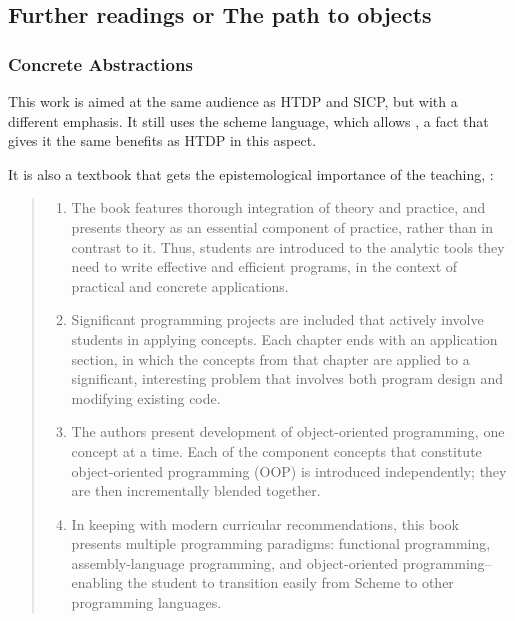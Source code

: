 \subsection{Further readings or The path to objects}

\subsubsection{Concrete Abstractions}

This  work is aimed at the same audience as HTDP and SICP, but with a different
emphasis. It still uses the scheme language, which allows , a fact
that gives it the same benefits as HTDP in this aspect.

It is also a textbook that gets the epistemological importance of the teaching,
:

\begin{quote}
    \begin{enumerate}
        \item  The book features thorough integration of theory and practice,
        and presents theory as an essential component of practice, rather than
        in contrast to it. Thus, students are introduced to the analytic tools
        they need to write effective and efficient programs, in the context of
        practical and concrete applications.

        \item Significant programming projects are included that actively
        involve students in applying concepts. Each chapter ends with an
        application section, in which the concepts from that chapter are applied
        to a significant, interesting problem that involves both program design
        and modifying existing code.
        
        \item The authors present development of object-oriented programming,
        one concept at a time. Each of the component concepts that constitute
        object-oriented programming (OOP) is introduced independently; they are
        then incrementally blended together.

        \item In keeping with modern curricular recommendations, this book
        presents multiple programming paradigms: functional programming,
        assembly-language programming, and object-oriented programming--enabling
        the student to transition easily from Scheme to other programming
        languages.

    \end{enumerate}
\end{quote}

